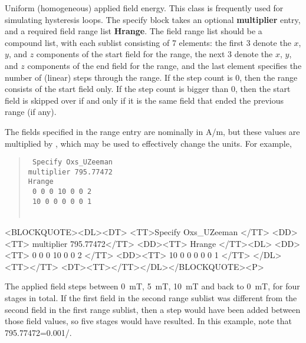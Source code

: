 \begin{description}
%
\item[Oxs\_UZeeman:\label{html:UZeeman}]
   Uniform (homogeneous) applied field energy.  This class is frequently
   used for simulating hysteresis loops.  The specify block takes an
   optional \textbf{multiplier} entry, and a required field range list
   \textbf{Hrange}.  The field range list should be a compound list,
   with each sublist consisting of 7 elements: the first 3 denote the
   $x$, $y$, and $z$ components of the start field for the range, the
   next 3 denote the $x$, $y$, and $z$ components of the end field for
   the  range, and the last element specifies the number of (linear) steps
   through the range.  If the step count is 0, then the range consists
   of the start field only.  If the step count is bigger than 0, then
   the start field is skipped over if and only if it is the same field
   that ended the previous range (if any).

   The fields specified in the range entry are nominally in A/m, but
   these values are multiplied by , which may be used to
   effectively change the units.  For example,
   \begin{latexonly}
      \begin{quote}\tt
      Specify Oxs\_UZeeman \ocb \\
         \bi multiplier 795.77472\\
         \bi Hrange \ocb\\
         \bi\bi \ocb\ 0 0 0 10 0 0 2 \ccb\\
         \bi\bi \ocb\ 10 0 0 0 0 0 1 \ccb\\
         \bi\ccb\\
      \ccb
      \end{quote}
   \end{latexonly}
   \begin{rawhtml}
   <BLOCKQUOTE><DL><DT>
      <TT>Specify Oxs_UZeeman {</TT>
         <DD><TT> multiplier 795.77472</TT>
         <DD><TT> Hrange {</TT><DL>
              <DD><TT> { 0 0 0 10 0 0 2 }</TT>
              <DD><TT> { 10 0 0 0 0 0 1 }</TT>
         </DL><TT>}</TT>
   <DT><TT>}</TT></DL></BLOCKQUOTE><P>
   \end{rawhtml}
   The applied field steps between 0~mT, 5~mT, 10~mT and back to 0~mT,
   for four stages in total.  If the first field in the second range
   sublist was different from the second field in the first range
   sublist, then a step would have been added between those field
   values, so five stages would have resulted.  In this example, note
   that 795.77472=0.001/\munaught.


\end{description}
